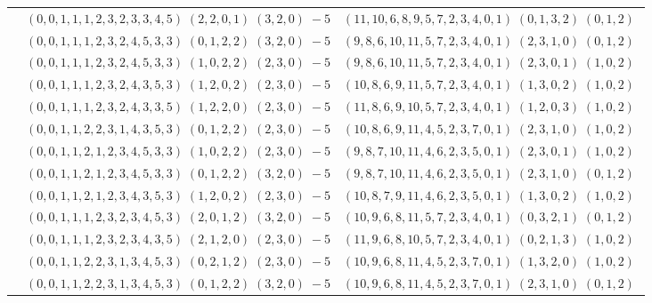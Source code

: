 \documentclass[11pt]{article}
\begin{document}
\begin{longtable}[l]{|c|c|c|}
 \cline{2-3} 
 & $(0 ,0 ,1 ,1 ,1 ,2 ,3 ,2 ,3 ,3 ,4 ,5) \;(2 ,2 ,0 ,1) \;(3 ,2 ,0) \;-5$ & $(11 ,10 ,6 ,8 ,9 ,5 ,7 ,2 ,3 ,4 ,0 ,1) \;(0 ,1 ,3 ,2) \;(0 ,1 ,2) \;$\\ 
 \cline{2-3} 
 & $(0 ,0 ,1 ,1 ,1 ,2 ,3 ,2 ,4 ,5 ,3 ,3) \;(0 ,1 ,2 ,2) \;(3 ,2 ,0) \;-5$ & $(9 ,8 ,6 ,10 ,11 ,5 ,7 ,2 ,3 ,4 ,0 ,1) \;(2 ,3 ,1 ,0) \;(0 ,1 ,2) \;$\\ 
 \cline{2-3} 
 & $(0 ,0 ,1 ,1 ,1 ,2 ,3 ,2 ,4 ,5 ,3 ,3) \;(1 ,0 ,2 ,2) \;(2 ,3 ,0) \;-5$ & $(9 ,8 ,6 ,10 ,11 ,5 ,7 ,2 ,3 ,4 ,0 ,1) \;(2 ,3 ,0 ,1) \;(1 ,0 ,2) \;$\\ 
 \cline{2-3} 
 & $(0 ,0 ,1 ,1 ,1 ,2 ,3 ,2 ,4 ,3 ,5 ,3) \;(1 ,2 ,0 ,2) \;(2 ,3 ,0) \;-5$ & $(10 ,8 ,6 ,9 ,11 ,5 ,7 ,2 ,3 ,4 ,0 ,1) \;(1 ,3 ,0 ,2) \;(1 ,0 ,2) \;$\\ 
 \cline{2-3} 
 & $(0 ,0 ,1 ,1 ,1 ,2 ,3 ,2 ,4 ,3 ,3 ,5) \;(1 ,2 ,2 ,0) \;(2 ,3 ,0) \;-5$ & $(11 ,8 ,6 ,9 ,10 ,5 ,7 ,2 ,3 ,4 ,0 ,1) \;(1 ,2 ,0 ,3) \;(1 ,0 ,2) \;$\\ 
 \cline{2-3} 
 & $(0 ,0 ,1 ,1 ,2 ,2 ,3 ,1 ,4 ,3 ,5 ,3) \;(0 ,1 ,2 ,2) \;(2 ,3 ,0) \;-5$ & $(10 ,8 ,6 ,9 ,11 ,4 ,5 ,2 ,3 ,7 ,0 ,1) \;(2 ,3 ,1 ,0) \;(1 ,0 ,2) \;$\\ 
 \cline{2-3} 
 & $(0 ,0 ,1 ,1 ,2 ,1 ,2 ,3 ,4 ,5 ,3 ,3) \;(1 ,0 ,2 ,2) \;(2 ,3 ,0) \;-5$ & $(9 ,8 ,7 ,10 ,11 ,4 ,6 ,2 ,3 ,5 ,0 ,1) \;(2 ,3 ,0 ,1) \;(1 ,0 ,2) \;$\\ 
 \cline{2-3} 
 & $(0 ,0 ,1 ,1 ,2 ,1 ,2 ,3 ,4 ,5 ,3 ,3) \;(0 ,1 ,2 ,2) \;(3 ,2 ,0) \;-5$ & $(9 ,8 ,7 ,10 ,11 ,4 ,6 ,2 ,3 ,5 ,0 ,1) \;(2 ,3 ,1 ,0) \;(0 ,1 ,2) \;$\\ 
 \cline{2-3} 
 & $(0 ,0 ,1 ,1 ,2 ,1 ,2 ,3 ,4 ,3 ,5 ,3) \;(1 ,2 ,0 ,2) \;(2 ,3 ,0) \;-5$ & $(10 ,8 ,7 ,9 ,11 ,4 ,6 ,2 ,3 ,5 ,0 ,1) \;(1 ,3 ,0 ,2) \;(1 ,0 ,2) \;$\\ 
 \cline{2-3} 
 & $(0 ,0 ,1 ,1 ,1 ,2 ,3 ,2 ,3 ,4 ,5 ,3) \;(2 ,0 ,1 ,2) \;(3 ,2 ,0) \;-5$ & $(10 ,9 ,6 ,8 ,11 ,5 ,7 ,2 ,3 ,4 ,0 ,1) \;(0 ,3 ,2 ,1) \;(0 ,1 ,2) \;$\\ 
 \cline{2-3} 
 & $(0 ,0 ,1 ,1 ,1 ,2 ,3 ,2 ,3 ,4 ,3 ,5) \;(2 ,1 ,2 ,0) \;(2 ,3 ,0) \;-5$ & $(11 ,9 ,6 ,8 ,10 ,5 ,7 ,2 ,3 ,4 ,0 ,1) \;(0 ,2 ,1 ,3) \;(1 ,0 ,2) \;$\\ 
 \cline{2-3} 
 & $(0 ,0 ,1 ,1 ,2 ,2 ,3 ,1 ,3 ,4 ,5 ,3) \;(0 ,2 ,1 ,2) \;(2 ,3 ,0) \;-5$ & $(10 ,9 ,6 ,8 ,11 ,4 ,5 ,2 ,3 ,7 ,0 ,1) \;(1 ,3 ,2 ,0) \;(1 ,0 ,2) \;$\\ 
 \cline{2-3} 
 & $(0 ,0 ,1 ,1 ,2 ,2 ,3 ,1 ,3 ,4 ,5 ,3) \;(0 ,1 ,2 ,2) \;(3 ,2 ,0) \;-5$ & $(10 ,9 ,6 ,8 ,11 ,4 ,5 ,2 ,3 ,7 ,0 ,1) \;(2 ,3 ,1 ,0) \;(0 ,1 ,2) \;$\\ 

\end{longtable}
\end{document}
